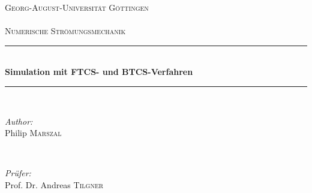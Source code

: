 \begin{titlepage}

\newcommand{\HRule}{\rule{\linewidth}{0.5mm}} %

\center %


\textsc{\LARGE Georg-August-Universität Göttingen}\\[1.5cm] %
\textsc{\Large }\\[0.5cm] %
\textsc{\large Numerische Strömungsmechanik}\\[0.5cm] %


\HRule \\[0.4cm]
{ \Large \bfseries Simulation mit FTCS- und BTCS-Verfahren}\\[0.4cm] %
\HRule \\[1.5cm]


\begin{minipage}{0.4\textwidth}
\begin{flushleft} \large
\emph{Author:}\\
Philip \textsc{Marszal} %
\end{flushleft}
\end{minipage}
~
\begin{minipage}{0.4\textwidth}
\begin{flushright} \large
\emph{Prüfer:} \\
Prof. Dr. Andreas \textsc{Tilgner} %
\end{flushright}
\end{minipage}\\[2cm]



\end{titlepage}
